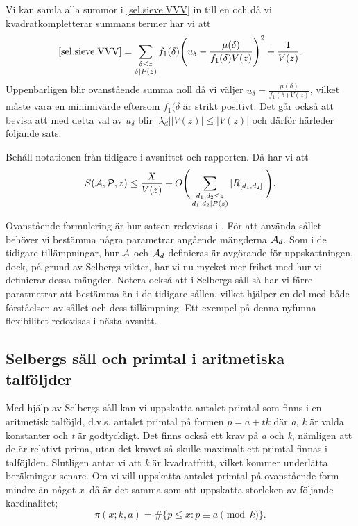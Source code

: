 Vi kan samla alla summor i \eqref{sel.sieve.VVV} in till en och då vi kvadratkompletterar summans termer har vi att
\begin{equation}
    \eqref{sel.sieve.VVV} = \sum_{\substack{\delta\leq z\\\delta|P(z)}}f_1(\delta)\Bigg(u_\delta - \frac{\mu(\delta)}{f_1(\delta)V(z)}\Bigg)^2 + \frac{1}{V(z)}.\nonumber
\end{equation}
Uppenbarligen blir ovanstående summa noll då vi väljer \(u_\delta = \frac{\mu(\delta)}{f_1(\delta)V(z)}\), vilket måste vara en minimivärde eftersom \(f_1(\delta\) är strikt positivt.
Det går också att bevisa att med detta val av \(u_\delta\) blir \(|\lambda_d||V(z)| \leq |V(z)|\) \cite[s. 122-123]{cojocarumurty} och därför härleder följande sats.
\begin{theorem}\label{sel.sieve.thm}
Behåll notationen från tidigare i avsnittet och rapporten. Då har vi att
\begin{equation}
    S(\mathcal{A}, \mathcal{P}, z) \leq \frac{X}{V(z)} + O\Bigg(\sum_{\substack{d_1,d_2\leq z\\d_1,d_2\mid P(z)}}|R_{[d_1, d_2]}|\Bigg).\nonumber
\end{equation}
\end{theorem}
Ovanstående formulering är hur satsen redovisas i \cite{cojocarumurty}. För att använda sållet behöver vi bestämma några parametrar angående mängderna \(\mathcal{A}_d\).
Som i de tidigare tillämpningar, hur \(\mathcal{A}\) och \(\mathcal{A}_d\) definieras är avgörande för uppskattningen, dock, på grund av Selbergs vikter, har vi nu mycket mer frihet med hur vi definierar dessa mängder. 
Notera också att i Selbergs såll så har vi färre paratmetrar att bestämma än i de tidigare sållen, vilket hjälper en del med både förståelsen av sållet och dess tillämpning. 
Ett exempel på denna nyfunna flexibilitet redovisas i nästa avsnitt.

\subsection{Selbergs såll och primtal i aritmetiska talföljder}

Med hjälp av Selbergs såll kan vi uppskatta antalet primtal som finns i en aritmetisk talföjld, d.v.s. antalet primtal på formen \(p = a + tk\) där \textit{a}, \textit{k} är valda konstanter och \textit{t} är godtyckligt. 
Det finns också ett krav på \textit{a} och \textit{k}, nämligen att de är relativt prima, utan det kravet så skulle maximalt ett primtal finnas i talföjlden. 
Slutligen antar vi att \textit{k} är kvadratfritt, vilket kommer underlätta beräkningar senare.
Om vi vill uppskatta antalet primtal på ovanstående form mindre än något \textit{x}, då är det samma som att uppskatta storleken av följande kardinalitet;
\begin{equation}
    \pi(x;k,a) = \#\{p\leq x: p \equiv a \pmod{k}\}.\label{sel.apl.arithPrimes}
\end{equation}

